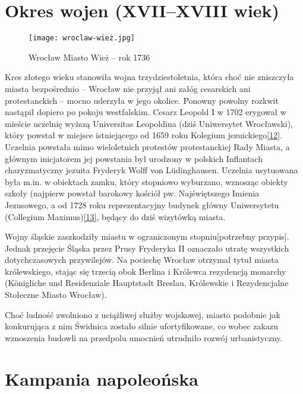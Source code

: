 \documentclass{article}
\begin{document}
\section{Okres wojen (XVII–XVIII wiek)}

\begin{wrapfigure}{r}{0.42\textwidth} 
\begin{center}
\vspace{-20pt}
\texttt{[image: wroclaw-wież.jpg]}
\end{center}
\vspace{-20pt}
\caption{Wrocław Miasto Wież – rok 1736}
\vspace{-10pt}
\end{wrapfigure}

Kres złotego wieku stanowiła wojna trzydziestoletnia, która choć nie zniszczyła miasta bezpośrednio – Wrocław nie przyjął ani załóg cesarskich ani protestanckich – mocno uderzyła w jego okolice. Ponowny powolny rozkwit nastąpił dopiero po pokoju westfalskim. Cesarz Leopold I w 1702 erygował w mieście uczelnię wyższą Universitas Leopoldina (dziś Uniwersytet Wrocławski), który powstał w miejsce istniejącego od 1659 roku Kolegium jezuickiego\hyperref[12]{[12]}. Uczelnia powstała mimo wieloletnich protestów protestanckiej Rady Miasta, a głównym inicjatorem jej powstania był urodzony w polskich Inflantach charyzmatyczny jezuita Fryderyk Wolff von Lüdinghausen. Uczelnia usytuowana była m.in. w obiektach zamku, który stopniowo wyburzano, wznosząc obiekty szkoły (najpierw powstał barokowy kościół pw. Najświętszego Imienia Jezusowego, a od 1728 roku reprezentacyjny budynek główny Uniwersytetu (Collegium Maximus)\hyperref[13]{[13]}, będący do dziś wizytówką miasta.

Wojny śląskie zaszkodziły miastu w ograniczonym stopniu[potrzebny przypis]. Jednak przejęcie Śląska przez Prusy Fryderyka II oznaczało utratę wszystkich dotychczasowych przywilejów. Na pociechę Wrocław otrzymał tytuł miasta królewskiego, stając się trzecią obok Berlina i Królewca rezydencją monarchy (Königliche und Residenziale Hauptstadt Breslau, Królewskie i Rezydencjalne Stołeczne Miasto Wrocław).

Choć ludność zwolniono z uciążliwej służby wojskowej, miasto podobnie jak konkurująca z nim Świdnica zostało silnie ufortyfikowane, co wobec zakazu wznoszenia budowli na przedpolu umocnień utrudniło rozwój urbanistyczny.
\newpage
\section{Kampania napoleońska}
\end{document}
